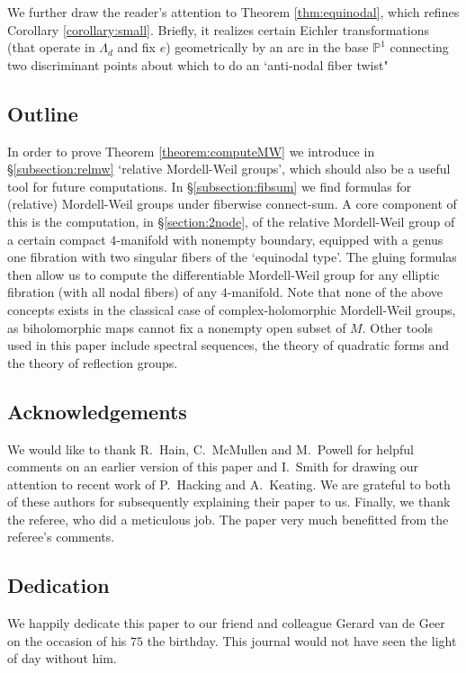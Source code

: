 \documentclass[10pt,letterpaper]{amsart}
\numberwithin{equation}{section}
\def\Pb{{\mathbb P}}
\theoremstyle{remark}
\begin{document}
We further draw the reader's attention to Theorem \ref{thm:equinodal}, which refines Corollary \ref{corollary:small}. Briefly, it realizes certain Eichler transformations (that operate in $\Lambda_d$ and fix $e$) geometrically by an arc in the base $\Pb^1$ connecting two discriminant points about which to do an `anti-nodal fiber twist"

\subsection{Outline} In order to prove Theorem 
\ref{theorem:computeMW} we introduce in \S\ref{subsection:relmw}  `relative Mordell-Weil groups', which should also be a useful tool for future computations.  In \S\ref{subsection:fibsum} we find formulas for (relative) Mordell-Weil groups under fiberwise connect-sum.  A core component of this is the computation, in \S\ref{section:2node}, of the relative Mordell-Weil group of a certain compact 
$4$-manifold with nonempty boundary, equipped with a genus one fibration with two singular fibers of the `equinodal type'.  The gluing formulas then allow us to compute the differentiable Mordell-Weil group for any elliptic fibration (with all nodal fibers) of any $4$-manifold.   Note that none of the above concepts exists in the classical case of complex-holomorphic Mordell-Weil groups, as biholomorphic maps cannot fix a nonempty  open subset of $M$. Other tools used in this paper include spectral sequences,  the theory of quadratic forms and the theory of reflection groups.

\subsection{Acknowledgements} We would like to thank  R.~Hain, C.~McMullen and M.~Powell for helpful comments on an earlier version of this paper and I.~Smith  for drawing our attention to recent work of P.~Hacking and A.~Keating. We are grateful to both of these authors for subsequently explaining their paper \cite{HK} to us.  Finally, we thank  the referee, who did a meticulous job. The paper very much benefitted from the referee's comments.

\subsection{Dedication} We happily dedicate this paper to  our friend and colleague Gerard van de Geer on the occasion of his 
$75$ the birthday. This journal would not have seen the light of day  without  him.
\end{document}

